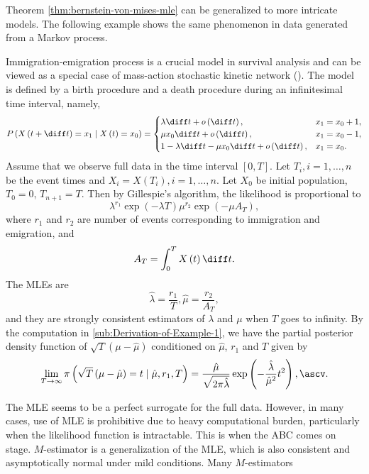 Theorem \ref{thm:bernstein-von-mises-mle} can be generalized to more
intricate models. The following example shows the same phenomenon
in data generated from a Markov process.
\begin{example}
\label{exa:Immigrate-emigrate-process}Immigration-emigration process
is {a } crucial
model in survival analysis and can be viewed as a special case of
mass-action stochastic kinetic  {network
} (\citet{wilkinson2011stochastic}). The model is defined by a birth
procedure and {a } death
procedure during an infinitesimal time interval, namely, 
\[
P\left(X\left(t+\diff t\right)=x_{1}\mid X\left(t\right)=x_{0}\right)=\begin{cases}
\lambda\diff t+o\left(\diff t\right), & x_{1}=x_{0}+1,\\
\mu x_{0}\diff t+o\left(\diff t\right), & x_{1}=x_{0}-1,\\
1-\lambda\diff t-\mu x_{0}\diff t+o\left(\diff t\right), & x_{1}=x_{0}.
\end{cases}
\]
Assume that we observe full data in the time interval $\left[0,T\right]$.
Let $T_{i},i=1,\ldots,n$ be the event times and $X_{i}=X\left(T_{i}\right),i=1,\ldots,n$.
Let $X_{0}$ be initial population, $T_{0}=0$, $T_{n+1}=T$. Then
by Gillespie's algorithm, the likelihood is proportional to 
\[
\lambda^{r_{1}}\exp\left(-\lambda T\right)\mu^{r_{2}}\exp\left(-\mu A_{T}\right),
\]
where $r_{1}$ and $r_{2}$ are number of events corresponding to
immigration and emigration, and 
\[
A_{T}=\int_{0}^{T}X\left(t\right)\diff t.
\]
The MLEs are 
\[
\hat{\lambda}=\frac{r_{1}}{T},\hat{\mu}=\frac{r_{2}}{A_{T}},
\]
and they are strongly consistent estimators of $\lambda$ {and $\mu$} when $T$ goes to
infinity. By the computation in  \ref{sub:Derivation-of-Example-1},
we have the partial posterior density function of $\sqrt{T}\left(\mu-\hat{\mu}\right)$
conditioned on $\hat{\mu}$, $r_{1}$ and $T$ given by 
\[
\lim_{T\rightarrow\infty}\pi\left(\sqrt{T}\left(\mu-\hat{\mu}\right)=t\mid\hat{\mu},r_{1},T\right)=\frac{\hat{\mu}}{\sqrt{2\pi\hat{\lambda}}}\exp\left(-\frac{\hat{\lambda}}{\hat{\mu}^{2}}t^{2}\right),\ascv.
\]

\end{example}
The MLE seems to be a perfect surrogate for  {the
} full data. However, in many cases, use of MLE is
prohibitive due to heavy computational burden, particularly when the
likelihood function is intractable. This is when the ABC comes on
stage. $M$-estimator is a generalization of the MLE, which is also
consistent and asymptotically normal under mild conditions. Many $M$-estimators
